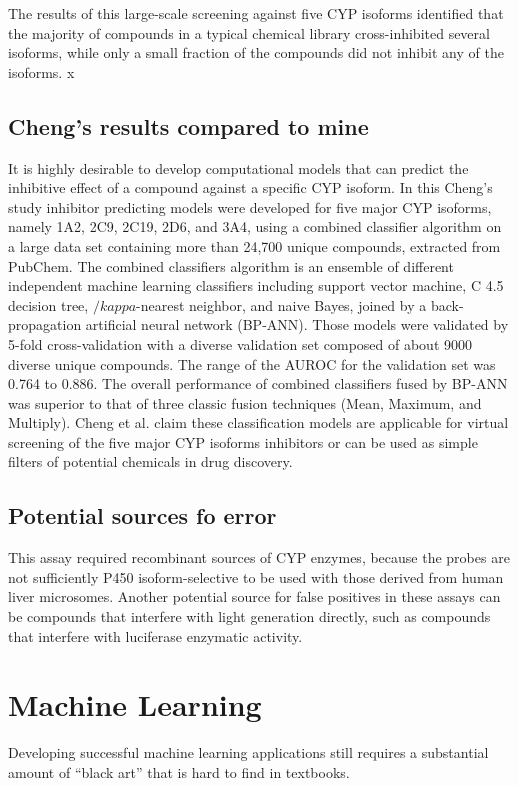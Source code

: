 The results of this large-scale screening against five CYP isoforms identified that the majority of compounds in a typical chemical library cross-inhibited several isoforms, while only a small fraction of the compounds did not inhibit any of the isoforms. \cite{Veith2009}x


\subsection{Cheng's results compared to mine}
It is highly desirable to develop computational models that can predict the inhibitive effect of a compound against a specific CYP isoform. In this Cheng's study inhibitor predicting models were developed for five major CYP isoforms, namely 1A2, 2C9, 2C19, 2D6, and 3A4, using a combined classifier algorithm on a large data set containing more than 24,700 unique compounds, extracted from PubChem. The combined classifiers algorithm is an ensemble of different independent machine learning classifiers including support vector machine, C 4.5 decision tree, $/kappa$-nearest neighbor, and naive Bayes, joined by a back-propagation artificial neural network (BP-ANN). Those models were validated by 5-fold cross-validation with a diverse validation set composed of about 9000 diverse unique compounds. The range of the AUROC for the validation set was 0.764 to 0.886. The overall performance of combined classifiers fused by BP-ANN was superior to that of three classic fusion techniques (Mean, Maximum, and Multiply). Cheng et al. claim these classification models are applicable for virtual screening of the five major CYP isoforms inhibitors or can be used as simple filters of potential chemicals in drug discovery.\cite{Cheng2011}

\subsection{Potential sources fo error}
This assay required recombinant sources of CYP enzymes, because the probes are not sufficiently P450 isoform-selective to be used with those derived from human liver microsomes. Another potential source for false positives in these assays can be compounds that interfere with light generation directly, such as compounds that interfere with luciferase enzymatic activity. \cite{Zlokarnik2005}


\section{Machine Learning}
Developing successful machine learning applications still requires a substantial amount of “black art” that is hard to find in textbooks.\cite{Domingos2012}

